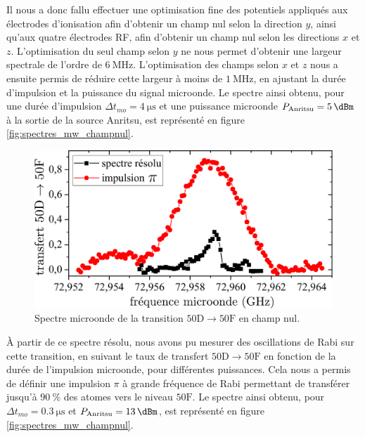Il nous a donc fallu effectuer une optimisation fine des potentiels appliqués aux électrodes d'ionisation afin d'obtenir un champ nul selon la direction $y$, ainsi qu'aux quatre électrodes RF, afin d'obtenir un champ nul selon les directions $x$ et $z$.
L'optimisation du seul champ selon $y$ ne nous permet d'obtenir une largeur spectrale de l'ordre de $\SI{6}{\MHz}$.
L'optimisation des champs selon $x$ et $z$ nous a ensuite permis de réduire cette largeur à moins de $\SI{1}{\MHz}$, en ajustant la durée d'impulsion et la puissance du signal microonde.
Le spectre ainsi obtenu, pour une durée d'impulsion $\Delta t _{mo} = \SI{4}{\us}$ et une puissance microonde $P_{\text{Anritsu}} = \SI{5}{\dBm}$ à la sortie de la source Anritsu, est représenté en figure \eqref{fig:spectres_mw_champnul}.
%
\begin{figure}[!h]
\centering
\includegraphics[width=0.85\linewidth]{figures/circulars/spectres_mw_champnul}
\caption[Spectre microonde de la transition $\mathrm{50D\rightarrow 50F}$ en champ nul]{
Spectre microonde de la transition $\mathrm{50D\rightarrow 50F}$ en champ nul.
}
\label{fig:spectres_mw_champnul}
\end{figure}
%
À partir de ce spectre résolu, nous avons pu mesurer des oscillations de Rabi sur cette transition, en suivant le taux de transfert $\mathrm{50D \rightarrow 50F}$ en fonction de la durée de l'impulsion microonde, pour différentes puissances.
Cela nous a permis de définir une impulsion $\pi$ à grande fréquence de Rabi permettant de transférer jusqu'à $\SI{90}{\percent}$ des atomes vers le niveau $\mathrm{50F}$.
Le spectre ainsi obtenu, pour $\Delta t_{mo} = \SI{0.3}{\us}$ et $P_{\text{Anritsu}} = \SI{13}{\dBm}$, est représenté en figure \eqref{fig:spectres_mw_champnul}.

